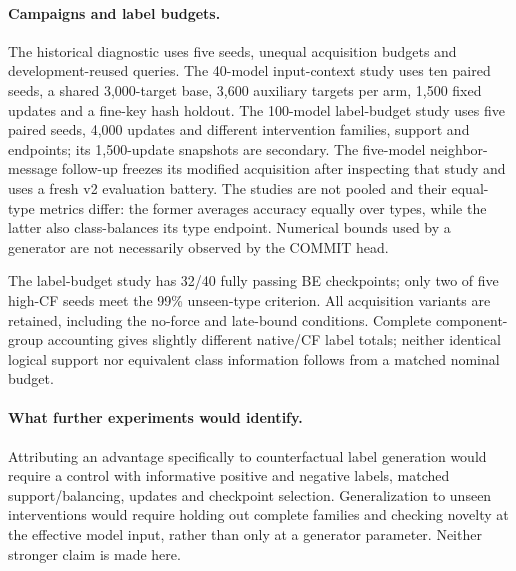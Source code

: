 \paragraph{Campaigns and label budgets.}
The historical diagnostic uses five seeds, unequal acquisition budgets and
development-reused queries. The 40-model input-context study uses ten paired
seeds, a shared 3,000-target base, 3,600 auxiliary targets per arm,
1,500 fixed updates and a fine-key hash holdout. The 100-model label-budget
study uses five paired seeds, 4,000 updates and different intervention
families, support and endpoints; its 1,500-update snapshots are secondary.
The five-model neighbor-message follow-up freezes its modified acquisition
after inspecting that study and uses a fresh v2 evaluation battery. The
studies are not pooled and their equal-type metrics differ: the former
averages accuracy equally over types, while the latter also class-balances
its type endpoint. Numerical bounds used by a generator are not necessarily
observed by the COMMIT head.

The label-budget study has 32/40 fully passing BE checkpoints; only two of
five high-CF seeds meet the 99\% unseen-type criterion. All acquisition
variants are retained, including the no-force and late-bound conditions.
Complete component-group accounting gives slightly different native/CF label
totals; neither identical logical support nor equivalent class information
follows from a matched nominal budget.

\paragraph{What further experiments would identify.}
Attributing an advantage specifically to counterfactual label generation
would require a control with informative positive and negative
labels, matched support/balancing, updates and checkpoint selection.
Generalization to unseen interventions would require holding out complete
families and checking novelty at the effective model input, rather than only
at a generator parameter. Neither stronger claim is made here.

